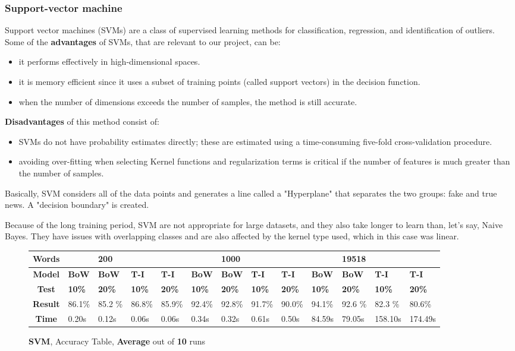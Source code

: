 \documentclass{article}
\begin{document}
	\subsubsection{Support-vector machine}
	Support vector machines (SVMs) are a class of supervised learning methods for classification, regression, and identification of outliers. Some of the \textbf{advantages} of SVMs, that are relevant to our project, can be:
	\begin{itemize}
    \item it performs effectively in high-dimensional spaces.
    \item it is memory efficient since it uses a subset of training points (called support vectors) in the decision function.
    \item when the number of dimensions exceeds the number of samples, the method is still accurate.
    \end{itemize}
    \textbf{Disadvantages} of this method consist of:
    \begin{itemize}
    \item SVMs do not have probability estimates directly; these are estimated using a time-consuming five-fold cross-validation procedure.
    \item avoiding over-fitting when selecting Kernel functions and regularization terms is critical if the number of features is much greater than the number of samples.
    \end{itemize}
   \par Basically, SVM considers all of the data points and generates a line called a "Hyperplane" that separates the two groups: fake and true news. A "decision boundary" is created.
	\par Because of the long training period, SVM are not appropriate for large datasets, and they also take longer to learn than, let's say, Naive Bayes. They have issues with overlapping classes and are also affected by the kernel type used, which in this case was linear.
	\begin{figure}[!h]
		\begin{tabular}{||c||l|l|l|l||l|l|l|l||l|l|l|l||}
			\hline
			\textbf{Words} &  & \textbf{200} & & & &\textbf{1000} & & & & \textbf{19518} &  & \\ \hline 
			\textbf{Model} & \textbf{BoW} & \textbf{BoW} & \textbf{T-I} & \textbf{T-I} &\textbf{BoW} & \textbf{BoW} & \textbf{T-I} & \textbf{T-I} & \textbf{BoW} & \textbf{BoW} & \textbf{T-I} & \textbf{T-I}\\ \hline
			\textbf{Test} & \textbf{10\%} & \textbf{20\%} & \textbf{10\%} & \textbf{20\%} & \textbf{10\%} & \textbf{20\%} & \textbf{10\%} & \textbf{20\%} & \textbf{10\%} & \textbf{20\%} & \textbf{10\%} & \textbf{20\%} \\ \hline \hline  
			\textbf{Result} & 86.1\% &85.2 \% & 86.8\% & 85.9\% &92.4\% &92.8\% &91.7\% & 90.0\% & 94.1\% &92.6 \% &82.3 \% &80.6\% \\ \hline  
			\textbf{Time} &0.20s & 0.12s & 0.06s & 0.06s & 0.34s &0.32s & 0.61s & 0.50s & 84.59s & 79.05s & 158.10s & 174.49s \\ \hline 
		\end{tabular}
		\caption{\textbf{SVM}, Accuracy Table, \textbf{Average} out of \textbf{10} runs}
	\end{figure}
\end{document}
